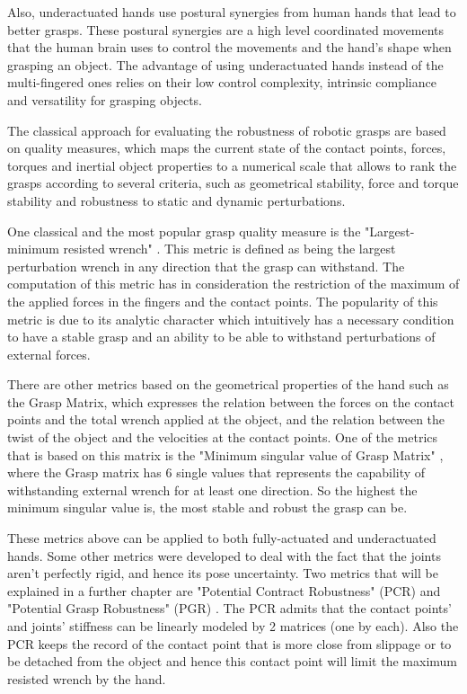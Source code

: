 Also, underactuated hands use postural synergies from human hands that lead to better grasps. These postural synergies are a high level coordinated movements that the human brain uses to control the movements and the hand's shape when grasping an object.
The advantage of using underactuated hands instead of the multi-fingered ones relies on their low control complexity, intrinsic compliance and versatility for grasping objects.
\par
The classical approach for evaluating the robustness of robotic grasps are based on quality measures, which maps the current state of the contact points, forces, torques and inertial object properties to a numerical scale that allows to rank the grasps according to several criteria, such as geometrical stability, force and torque stability and robustness to static and dynamic perturbations.
\par
One classical and the most popular grasp quality measure is the "Largest-minimum resisted wrench" \cite{ferrari1992planning}. This metric is defined as being the largest perturbation wrench in any direction that the grasp can withstand.
The computation of this metric has in consideration the restriction of the maximum of the applied forces in the fingers and the contact points.
The popularity of this metric is due to its analytic character which intuitively has a necessary condition to have a stable grasp and an ability to be able to withstand perturbations of external forces.
\par
There are other metrics based on the geometrical properties of the hand such as the Grasp Matrix, which expresses the relation between the forces on the contact points and the total wrench applied at the object, and the relation between the twist of the object and the velocities at the contact points. One of the metrics that is based on this matrix is the "Minimum singular value of Grasp Matrix" \cite{roa2015grasp}, where the Grasp matrix has 6 single values that represents the capability of withstanding external wrench for at least one direction. So the highest the minimum singular value is, the most stable and robust the grasp can be.
\par
These metrics above can be applied to both fully-actuated and underactuated hands. Some other metrics were developed to deal with the fact that the joints aren't perfectly rigid, and hence its pose uncertainty. Two metrics that will be explained in a further chapter are "Potential Contract Robustness" (PCR) and "Potential Grasp Robustness" (PGR) \cite{pozzi2016grasp}. The PCR admits that the contact points' and joints' stiffness can be linearly modeled by 2 matrices (one by each). Also the PCR keeps the record of the contact point that is more close from slippage or to be detached from the object and hence this contact point will limit the maximum resisted wrench by the hand.
